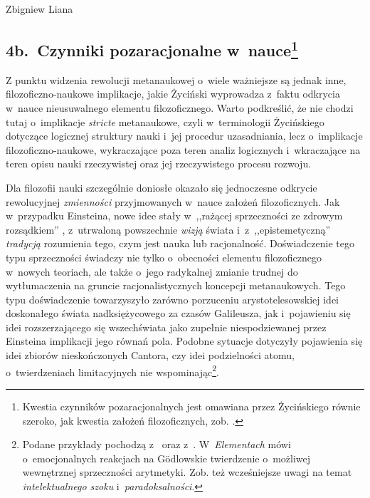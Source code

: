 \begin{artplenv}{Zbigniew Liana}
\subsection{4b.~Czynniki pozaracjonalne w~nauce\footnote{Kwestia czynników pozaracjonalnych jest omawiana przez Życińskiego równie
szeroko, jak kwestia założeń filozoficznych, zob.
\parencites[s.~127–154]{zycinski_jezyk_1983}[s.~156–166]{zycinski_teizm_1985}[rozdz. 5]%
{zycinski_structure_1988}[rozdz. 5]{zycinski_struktura_2013}%
[rozdz. 7]{zycinski_elementy_1996}.
	}
}

Z punktu widzenia rewolucji metanaukowej o~wiele ważniejsze są jednak inne, filozoficzno-naukowe implikacje, jakie
Życiński wyprowadza z~faktu odkrycia w~nauce nieusuwalnego elementu filozoficznego. Warto podkreślić, że nie chodzi
tutaj o~implikacje \textit{stricte} metanaukowe, czyli w~terminologii Życińskiego dotyczące logicznej struktury nauki i~jej
procedur uzasadniania, lecz o~implikacje filozoficzno-naukowe, wykraczające poza teren analiz
logicznych i~wkraczające na teren opisu nauki rzeczywistej oraz jej rzeczywistego procesu rozwoju. 

Dla filozofii nauki szczególnie doniosłe okazało się jednoczesne odkrycie rewolucyjnej \textit{zmienności} przyjmowanych w~nauce
założeń filozoficznych. Jak w~przypadku Einsteina, nowe idee stały w~,,rażącej sprzeczności ze zdrowym rozsądkiem''
\parencite[s.~249]{zycinski_jezyk_1983},
z~utrwaloną powszechnie \textit{wizją} świata
\mbox{\parencite[s.~229]{zycinski_elementy_1996}}
i~z~,,epistemetyczną'' \textit{tradycją} rozumienia tego,
czym jest nauka lub racjonalność.  Doświadczenie tego typu sprzeczności świadczy nie tylko o~obecności elementu
filozoficznego w~nowych teoriach, ale także o~jego radykalnej zmianie trudnej do wytłumaczenia na gruncie
racjonalistycznych koncepcji metanaukowych. Tego typu doświadczenie towarzyszyło zarówno porzuceniu arystotelesowskiej
idei doskonałego świata nadksiężycowego za czasów Galileusza, jak i~pojawieniu się idei rozszerzającego się
wszechświata jako zupełnie niespodziewanej przez Einsteina implikacji jego równań pola. Podobne sytuacje dotyczyły
pojawienia się idei zbiorów nieskończonych Cantora, czy idei podzielności atomu, o~twierdzeniach limitacyjnych nie
wspominając\footnote{Podane przykłady pochodzą
z~\parencite[s.~187]{zycinski_jezyk_1983}
oraz
z~\parencite[s.~247]{zycinski_elementy_1996}.
W~\textit{Elementach}
\parencite[s.~267n]{zycinski_elementy_1996}
mówi o~emocjonalnych reakcjach na Gödlowskie twierdzenie o~możliwej
wewnętrznej sprzeczności arytmetyki. Zob. też wcześniejsze uwagi na temat \textit{intelektualnego szoku} i~\textit{paradoksalności}.}.


\end{artplenv}
